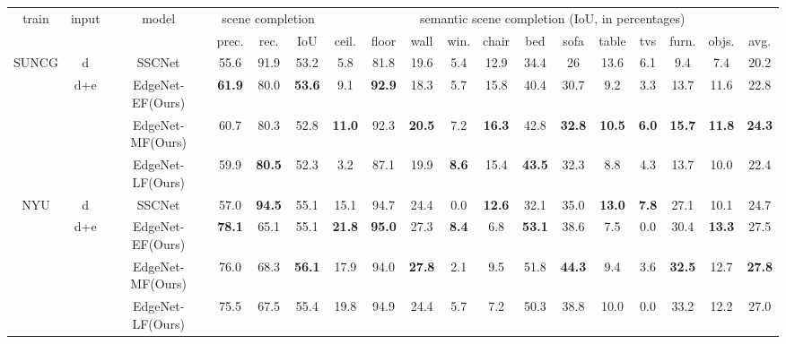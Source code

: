 \begin{table*}
  \centering
  \begin{tabular}
      { c | c | c | c c c | c c c c c c c c c c c c}
  \hline
      \multirow{ 2}{*}{train}&\multirow{ 2}{*}{input}&\multirow{ 2}{*}{model} & \multicolumn{3}{c|}{scene completion} & \multicolumn{12}{c}{semantic scene completion (IoU, in percentages)} \\
       & & & prec. & rec. & IoU & ceil. & floor & wall & win. & chair & bed & sofa & table & tvs & furn. & objs. & avg. \\
  \midrule\midrule
       \multirow{4}{*}{SUNCG}&\multirow{1}{*}{d} &SSCNet\cite{song_semantic_2017} & 55.6 & 91.9 & 53.2 & 5.8 & 81.8 & 19.6 & 5.4 & 12.9 & 34.4 & 26 & 13.6 & 6.1 & 9.4 & 7.4 & 20.2\\ \cline{2-18}
       &\multirow{3}{*}{d+e}
&EdgeNet-EF(Ours) &  \textbf{61.9} &80.0&\textbf{53.6} &9.1&\textbf{92.9}&18.3&5.7&15.8&40.4&30.7&9.2&3.3&13.7&11.6&22.8\\
&&EdgeNet-MF(Ours) & 60.7 & 80.3 & 52.8 & \textbf{11.0} & 92.3 & \textbf{20.5} & 7.2 & \textbf{16.3} &42.8 & \textbf{32.8} & \textbf{10.5} & \textbf{6.0} &\textbf{ 15.7} &\textbf{11.8} & \textbf{24.3}\\ &&EdgeNet-LF(Ours) & 59.9 & \textbf{80.5} & 52.3 & 3.2 & 87.1 & 19.9 & \textbf{8.6} & 15.4 & \textbf{ 43.5} & 32.3 & 8.8 & 4.3 & 13.7 &10.0 & 22.4\\ \midrule\midrule
      \multirow{4}{*}{NYU}&\multirow{1}{*}{d}&SSCNet\cite{song_semantic_2017} 
      & 57.0 & \textbf{94.5} & 55.1 & 15.1 & 94.7 & 24.4 & 0.0 & \textbf{12.6} & 32.1 & 35.0 & \textbf{13.0} & \textbf{7.8} & 27.1 & 10.1 & 24.7\\  \cline{2-18}
      &\multirow{ 3}{*}{d+e}
&EdgeNet-EF(Ours) &  \textbf{78.1}  & 65.1 & 55.1 & \textbf{21.8} & \textbf{95.0} & 27.3 & \textbf{8.4} & 6.8 & \textbf{53.1} & 38.6 & 7.5 & 0.0 & 30.4 & \textbf{13.3} & 27.5\\
&&EdgeNet-MF(Ours) & 76.0 & 68.3 & \textbf{56.1} & 17.9 & 94.0 & \textbf{27.8} & 2.1 & 9.5 &51.8 & \textbf{44.3} & 9.4 & 3.6 &\textbf{ 32.5} &12.7 & \textbf{27.8}\\ &&EdgeNet-LF(Ours) & 75.5 & 67.5 & 55.4 & 19.8 & 94.9 & 24.4 & 5.7 & 7.2 & 50.3 & 38.8 & 10.0 & 0.0 &33.2 &12.2 & 27.0\\ 


\end{tabular}
\end{table*}
